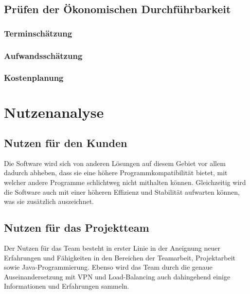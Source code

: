 \documentclass[a4paper,12pt]{scrreprt}
\begin{document}
	\section{Pr\"ufen der \"Okonomischen Durchf\"uhrbarkeit}
		
		\subsection{Terminsch\"atzung}
			
			
			
			
		\subsection{Aufwandssch\"atzung}
			
		\subsection{Kostenplanung}
			
\chapter{Nutzenanalyse}
	
	\section{Nutzen f\"ur den Kunden}
	
	Die Software wird sich von anderen Lösungen auf diesem Gebiet vor allem dadurch abheben, dass sie eine höhere Programmkompatibilität bietet, mit welcher andere Programme schlichtweg nicht mithalten können. Gleichzeitig wird die Software auch mit einer höheren Effizienz und Stabilität aufwarten können, was sie zusätzlich auszeichnet.
	
	\section{Nutzen f\"ur das Projektteam}
	
	Der Nutzen für das Team besteht in erster Linie in der Aneignung neuer Erfahrungen und Fähigkeiten in den Bereichen der Teamarbeit, Projektarbeit sowie Java-Programmierung. Ebenso wird das Team durch die genaue Auseinandersetzung mit VPN und Load-Balancing auch dahingehend einige Informationen und Erfahrungen sammeln.
	
\end{document}
